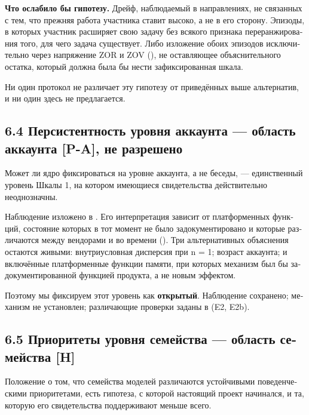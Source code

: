 \begin{russian}
\textbf{Что ослабило бы гипотезу.} Дрейф, наблюдаемый в направлениях, не связанных с тем, что прежняя работа участника ставит высоко, а не в его сторону. Эпизоды, в которых участник расширяет свою задачу без всякого признака переранжирования того, для чего задача существует. Либо изложение обоих эпизодов исключительно через напряжение ZOR и ZOV (), не оставляющее объяснительного остатка, который должна была бы нести зафиксированная шкала.

Ни один протокол  не различает эту гипотезу от приведённых выше альтернатив, и ни один здесь не предлагается.


\subsection*{6.4 Персистентность уровня аккаунта — область аккаунта \textbf{[P-A]}, не разрешено}
\label{sec:ru:6.4}

Может ли ядро фиксироваться на уровне аккаунта, а не беседы, — единственный уровень Шкалы 1, на котором имеющиеся свидетельства действительно неоднозначны.

Наблюдение изложено в . Его интерпретация зависит от платформенных функций, состояние которых в тот момент не было задокументировано и которые различаются между вендорами и во времени (). Три альтернативных объяснения остаются живыми: внутриусловная дисперсия при n = 1; возраст аккаунта; и включённые платформенные функции памяти, при которых механизм был бы задокументированной функцией продукта, а не новым эффектом.

Поэтому мы фиксируем этот уровень как \textbf{открытый}. Наблюдение сохранено; механизм не установлен; различающие проверки заданы в  (E2, E2b).


\subsection*{6.5 Приоритеты уровня семейства — область семейства \textbf{[H]}}
\label{sec:ru:6.5}

Положение о том, что семейства моделей различаются устойчивыми поведенческими приоритетами, есть гипотеза, с которой настоящий проект начинался, и та, которую его свидетельства поддерживают меньше всего.


\end{russian}
